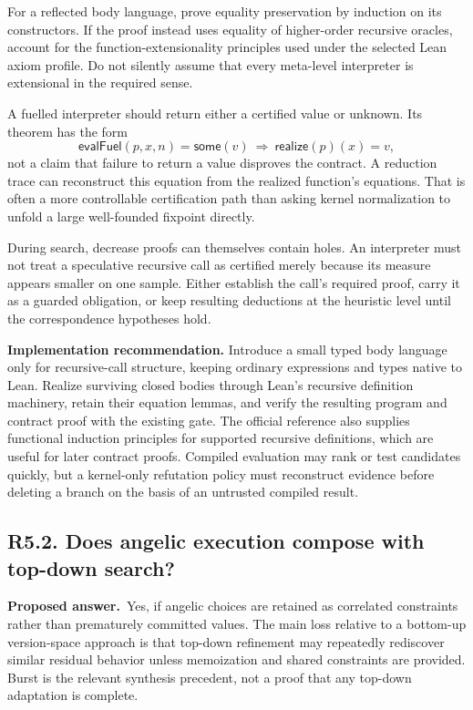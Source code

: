 \documentclass[11pt,a4paper]{article}
\newcommand{\question}[2]{\subsection{#1. #2}\label{q:#1}}
\newcommand{\answer}{\textbf{Proposed answer.}\ }
\theoremstyle{remark}
\begin{document}
For a reflected body language, prove equality preservation by induction on
its constructors. If the proof instead uses equality of higher-order
recursive oracles, account for the function-extensionality principles used
under the selected Lean axiom profile. Do not silently assume that every
meta-level interpreter is extensional in the required sense.

A fuelled interpreter should return either a certified value or unknown.
Its theorem has the form
\[
 \mathsf{evalFuel}(p,x,n)=\mathsf{some}(v)
 \ \Longrightarrow\ \mathsf{realize}(p)(x)=v,
\]
not a claim that failure to return a value disproves the contract. A reduction
trace can reconstruct this equation from the realized function's equations.
That is often a more controllable certification path than asking kernel
normalization to unfold a large well-founded fixpoint directly.

During search, decrease proofs can themselves contain holes. An interpreter
must not treat a speculative recursive call as certified merely because its
measure appears smaller on one sample. Either establish the call's required
proof, carry it as a guarded obligation, or keep resulting deductions at the
heuristic level until the correspondence hypotheses hold.

\textbf{Implementation recommendation.} Introduce a small typed body language
only for recursive-call structure, keeping ordinary expressions and types
native to Lean. Realize surviving closed bodies through Lean's recursive
definition machinery, retain their equation lemmas, and verify the resulting
program and contract proof with the existing gate. The official reference
also supplies functional induction principles for supported recursive
definitions, which are useful for later contract proofs.\cite{leanmanual}
Compiled evaluation may rank or test candidates quickly, but a kernel-only
refutation policy must reconstruct evidence before deleting a branch on the
basis of an untrusted compiled result.

\question{R5.2}{Does angelic execution compose with top-down search?}

\answer Yes, if angelic choices are retained as correlated constraints rather
than prematurely committed values. The main loss relative to a bottom-up
version-space approach is that top-down refinement may repeatedly rediscover
similar residual behavior unless memoization and shared constraints are
provided. Burst is the relevant synthesis precedent, not a proof that any
top-down adaptation is complete.\cite{burst}
\end{document}
